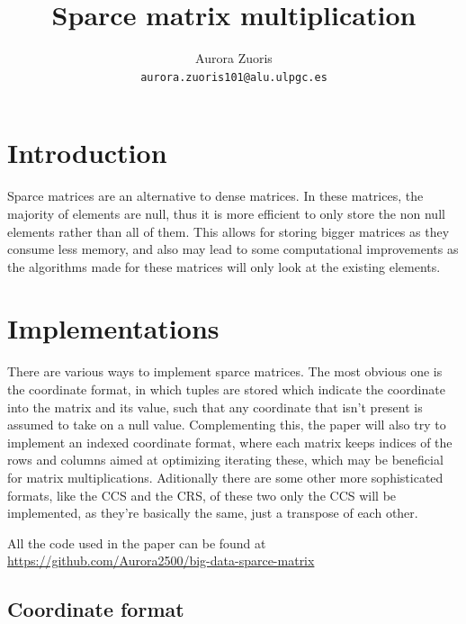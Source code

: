 \documentclass{article}
\author{Aurora Zuoris \\ \texttt{aurora.zuoris101@alu.ulpgc.es}}
\title{Sparce matrix multiplication}
\begin{document}
\maketitle


\section{Introduction}

Sparce matrices are an alternative to dense matrices.
In these matrices, the majority of elements are null, thus it is more efficient to only store the
non null elements rather than all of them. This allows for storing bigger matrices as they consume less memory,
and also may lead to some computational improvements as the algorithms made for these matrices will only look at the existing elements.

\section{Implementations}

There are various ways to implement sparce matrices.
The most obvious one is the coordinate format, in which tuples are stored which indicate the coordinate into the matrix and its value,
such that any coordinate that isn't present is assumed to take on a null value.
Complementing this, the paper will also try to implement an indexed coordinate format, where each matrix keeps indices of the rows and columns
aimed at optimizing iterating these, which may be beneficial for matrix multiplications.
Aditionally there are some other more sophisticated formats, like the CCS and the CRS,
of these two only the CCS will be implemented, as they're basically the same, just a transpose of each other.

All the code used in the paper can be found at \url{https://github.com/Aurora2500/big-data-sparce-matrix}

\subsection{Coordinate format}
\end{document}

